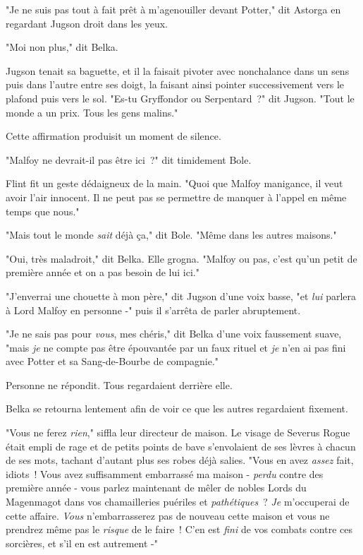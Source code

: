 "Je ne suis pas tout à fait prêt à m'agenouiller devant Potter," dit Astorga en regardant Jugson droit dans les yeux.

"Moi non plus," dit Belka.

Jugson tenait sa baguette, et il la faisait pivoter avec nonchalance dans un sens puis dans l'autre entre ses doigt, la faisant ainsi pointer successivement vers le plafond puis vers le sol. "Es-tu Gryffondor ou Serpentard~?" dit Jugson. "Tout le monde a un prix. Tous les gens malins."

Cette affirmation produisit un moment de silence.

"Malfoy ne devrait-il pas être ici~?" dit timidement Bole.

Flint fit un geste dédaigneux de la main. "Quoi que Malfoy manigance, il veut avoir l'air innocent. Il ne peut pas se permettre de manquer à l'appel en même temps que nous."

"Mais tout le monde \emph{sait} déjà ça," dit Bole. "Même dans les autres maisons."

"Oui, très maladroit," dit Belka. Elle grogna. "Malfoy ou pas, c'est qu'un petit de première année et on a pas besoin de lui ici."

"J'enverrai une chouette à mon père," dit Jugson d'une voix basse, "et \emph{lui} parlera à Lord Malfoy en personne -" puis il s'arrêta de parler abruptement.

"Je ne sais pas pour \emph{vous}, mes chéris," dit Belka d'une voix faussement suave, "mais \emph{je} ne compte pas être épouvantée par un faux rituel et \emph{je} n'en ai pas fini avec Potter et sa Sang-de-Bourbe de compagnie."

Personne ne répondit. Tous regardaient derrière elle.

Belka se retourna lentement afin de voir ce que les autres regardaient fixement.

"Vous ne ferez \emph{rien}," siffla leur directeur de maison. Le visage de Severus Rogue était empli de rage et de petits points de bave s'envolaient de ses lèvres à chacun de ses mots, tachant d'autant plus ses robes déjà salies. "Vous en avez \emph{assez} fait, idiots~! Vous avez suffisamment embarrassé ma maison - \emph{perdu} contre des première année - vous parlez maintenant de mêler de nobles Lords du Magenmagot dans vos chamailleries puériles et \emph{pathétiques}~? \emph{Je} m'occuperai de cette affaire. \emph{Vous} n'embarrasserez pas de nouveau cette maison et vous ne prendrez même pas le \emph{risque} de le faire~! C'en est \emph{fini} de vos combats contre ces sorcières, et s'il en est autrement -"

